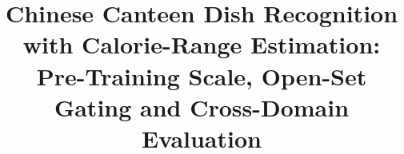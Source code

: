 \documentclass[conference]{IEEEtran}
\begin{document}
\title{Chinese Canteen Dish Recognition with Calorie-Range Estimation: Pre-Training Scale, Open-Set Gating and Cross-Domain Evaluation}

\author{
}

\maketitle
\end{document}
